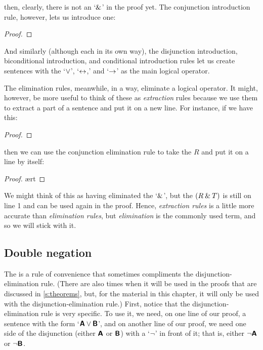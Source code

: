 \noindent then, clearly, there is not an `$\mathbin{\&}$' in the proof yet. The conjunction introduction rule, however, lets us introduce one:

\begin{proof}
	 
\end{proof}

\noindent And similarly (although each in its own way), the disjunction introduction, biconditional introduction, and conditional introduction rules let us create sentences with the `$\vee$', `$\leftrightarrow$,' and `$\rightarrow$' as the main logical operator.

The elimination rules, meanwhile, in a way, eliminate a logical operator. It might, however, be more useful to think of these as \textit{extraction} rules because we use them to extract a part of a sentence and put it on a new line. For instance, if we have this:

\begin{proof}
	 \pr{}
\end{proof}

\noindent then we can use the conjunction elimination rule to take the $R$ and put it on a line by itself:

\begin{proof}
	 \ae{rt}
\end{proof}

\noindent We might think of this as having eliminated the `$\mathbin{\&}$', but the $(R \mathbin{\&} T)$ is still on line 1 and can be used again in the proof. Hence, \textit{extraction rules} is a little more accurate than \textit{elimination rules}, but \textit{elimination} is the commonly used term, and so we will stick with it. 


\subsection{Double negation}\label{subsection-DN}

The  is a rule of convenience that sometimes compliments the disjunction-elimination rule. (There are also times when it will be used in the proofs that are discussed in \ref{s:theorems}, but, for the material in this chapter, it will only be used with the disjunction-elimination rule.) First, notice that the disjunction-elimination rule is very specific. To use it, we need, on one line of our proof, a sentence with the form `$\bm{\mathsf{A}}\vee\bm{\mathsf{B}}$', and on another line of our proof, we need one side of the disjunction (either $\bm{\mathsf{A}}$ or $\bm{\mathsf{B}}$) with a `${\neg}$' in front of it; that is, either ${\neg}\bm{\mathsf{A}}$ or ${\neg}\bm{\mathsf{B}}$. 

